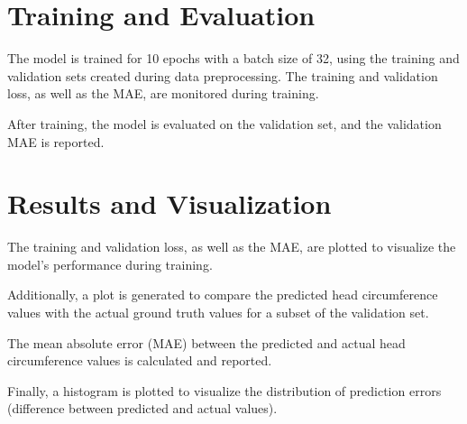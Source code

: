 \documentclass[twocolumn]{article}
\begin{document}
\section{Training and Evaluation}
The model is trained for 10 epochs with a batch size of 32, using the training and validation sets created during data preprocessing. The training and validation loss, as well as the MAE, are monitored during training.

After training, the model is evaluated on the validation set, and the validation MAE is reported.

\section{Results and Visualization}
The training and validation loss, as well as the MAE, are plotted to visualize the model's performance during training.

Additionally, a plot is generated to compare the predicted head circumference values with the actual ground truth values for a subset of the validation set.

The mean absolute error (MAE) between the predicted and actual head circumference values is calculated and reported.

Finally, a histogram is plotted to visualize the distribution of prediction errors (difference between predicted and actual values).
\end{document}
